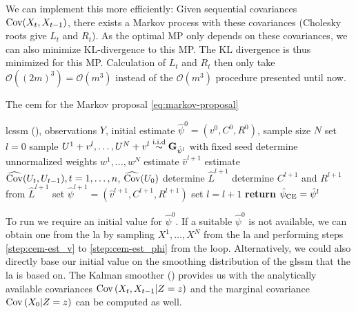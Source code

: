 \begin{tcolorbox}[title={WIP improve: order to $\mathcal O(m^{3})$}]
    We can implement this more efficiently: Given sequential covariances $\operatorname{Cov} (X_{t}, X_{t - 1})$, there exists a Markov process with these covariances (Cholesky roots give $L_{t}$ and $R_{t}$). As the optimal MP only depends on these covariances, we can also minimize KL-divergence to this MP. The KL divergence is thus minimized for this MP. Calculation of $L_{t}$ and $R_{t}$ then only take $\mathcal O((2m)^{3}) = \mathcal O(m^{3})$ instead of the $\mathcal O(m^{3})$ procedure presented until now. 
\end{tcolorbox}
\begin{algorithm}
    \caption{The \gls{cem} for the Markov proposal \eqref{eq:markov-proposal}}
    \label{alg:cem-markov-proposal}
    \begin{algorithmic}[1]
        \Require \gls{lcssm} (), observations $Y$, initial estimate $\hat\psi^0 = \left( v^{0}, C^{0}, R^{0}\right)$, sample size $N$
        \State set $l = 0$
        \Repeat 
            \State\label{step:cem-simulate} sample $U^{1} + v^{l}, \dots, U^{N} + v^{l} \stackrel{\text{i.i.d}}{\sim} \mathbf G_{\hat\psi^{l}}$ with fixed seed  
            \State\label{step:cem-weights} determine unnormalized weights $w^{1}, \dots, w^{N}$ 
            \State\label{step:cem-est_v} estimate $\hat v^{l + 1}$  
            \State\label{step:cem-est_cov} estimate $\widehat{\operatorname{Cov}} (U_{t}, U_{t-1}), t=1, \dots, n$, $\widehat{\operatorname{Cov}} (U_{0})$ 
            \State\label{step:cem-L} determine $\hat L^{l + 1}$ 
            \State\label{step:cem-C_R} determine $C^{l + 1}$ and $R^{l + 1}$ from $\hat L^{l + 1}$ 
            \State\label{step:cem-est_phi} set $\hat\psi^{l + 1} = \left( \hat v^{l + 1}, C^{l + 1}, R^{l + 1}\right)$ 
            \State set $l = l + 1$
        \State \textbf{return} ${\hat\psi_{\text{CE}}} = \hat \psi^{l}$
    \end{algorithmic}
\end{algorithm}

To run  we require an initial value for $\hat\psi^{0}$. If a suitable $\hat\psi^{0}$ is not available, we can obtain one from the \gls{la} by sampling $X^{1}, \dots, X^{N}$ from the \gls{la} and performing steps \ref{step:cem-est_v} to \ref{step:cem-est_phi} from the loop.
Alternatively, we could also directly base our initial value on the smoothing distribution of the \gls{glssm} that the \gls{la} is based on. The Kalman smoother () provides us with the analytically available covariances $\operatorname{Cov} \left( X_{t}, X_{t - 1} | Z = z \right)$ and the marginal covariance $\operatorname{Cov} \left( X_{0} | Z = z \right)$ can be computed as well. 

